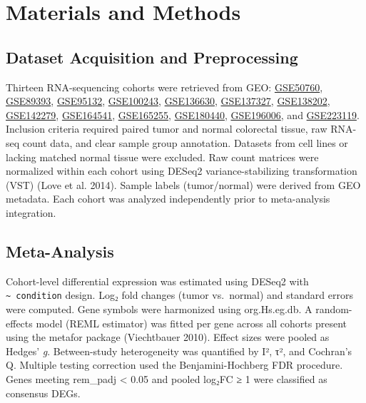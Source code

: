 \documentclass[
  12pt,
]{article}
\begin{document}
\section{Materials and Methods}\label{materials-and-methods}

\subsection{Dataset Acquisition and
Preprocessing}\label{dataset-acquisition-and-preprocessing}

Thirteen RNA-sequencing cohorts were retrieved from GEO:
\href{https://www.ncbi.nlm.nih.gov/geo/query/acc.cgi?acc=GSE50760}{GSE50760},
\href{https://www.ncbi.nlm.nih.gov/geo/query/acc.cgi?acc=GSE89393}{GSE89393},
\href{https://www.ncbi.nlm.nih.gov/geo/query/acc.cgi?acc=GSE95132}{GSE95132},
\href{https://www.ncbi.nlm.nih.gov/geo/query/acc.cgi?acc=GSE100243}{GSE100243},
\href{https://www.ncbi.nlm.nih.gov/geo/query/acc.cgi?acc=GSE136630}{GSE136630},
\href{https://www.ncbi.nlm.nih.gov/geo/query/acc.cgi?acc=GSE137327}{GSE137327},
\href{https://www.ncbi.nlm.nih.gov/geo/query/acc.cgi?acc=GSE138202}{GSE138202},
\href{https://www.ncbi.nlm.nih.gov/geo/query/acc.cgi?acc=GSE142279}{GSE142279},
\href{https://www.ncbi.nlm.nih.gov/geo/query/acc.cgi?acc=GSE164541}{GSE164541},
\href{https://www.ncbi.nlm.nih.gov/geo/query/acc.cgi?acc=GSE165255}{GSE165255},
\href{https://www.ncbi.nlm.nih.gov/geo/query/acc.cgi?acc=GSE180440}{GSE180440},
\href{https://www.ncbi.nlm.nih.gov/geo/query/acc.cgi?acc=GSE196006}{GSE196006},
and
\href{https://www.ncbi.nlm.nih.gov/geo/query/acc.cgi?acc=GSE223119}{GSE223119}.
Inclusion criteria required paired tumor and normal colorectal tissue,
raw RNA-seq count data, and clear sample group annotation. Datasets from
cell lines or lacking matched normal tissue were excluded. Raw count
matrices were normalized within each cohort using DESeq2
variance-stabilizing transformation (VST) (Love et al. 2014). Sample
labels (tumor/normal) were derived from GEO metadata. Each cohort was
analyzed independently prior to meta-analysis integration.

\subsection{Meta-Analysis}\label{meta-analysis}

Cohort-level differential expression was estimated using DESeq2 with
\texttt{\textasciitilde{}\ condition} design. Log₂ fold changes (tumor
vs.~normal) and standard errors were computed. Gene symbols were
harmonized using org.Hs.eg.db. A random-effects model (REML estimator)
was fitted per gene across all cohorts present using the metafor package
(Viechtbauer 2010). Effect sizes were pooled as Hedges' \emph{g}.
Between-study heterogeneity was quantified by I², τ², and Cochran's Q.
Multiple testing correction used the Benjamini-Hochberg FDR procedure.
Genes meeting rem\_padj \textless{} 0.05 and \textbar pooled
log₂FC\textbar{} ≥ 1 were classified as consensus DEGs.
\end{document}
